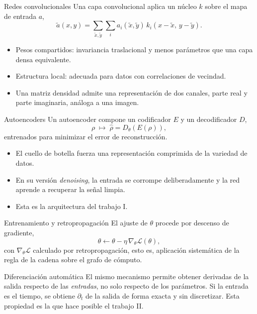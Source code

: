 \documentclass[10pt,aspectratio=169]{beamer}
\newcommand{\dens}{\rho}
\newcommand{\densh}{\hat{\rho}}
\begin{document}
\begin{frame}{Redes convolucionales}
  Una capa convolucional aplica un núcleo $k$ sobre el mapa de entrada $a$,
  \[
    \tilde{a}(x,y) = \sum_{\tilde{x},\tilde{y}} \sum_i a_i(\tilde{x},\tilde{y})\, k_i(x-\tilde{x},\, y-\tilde{y}).
  \]
  \pause
  \vfill
  \begin{itemize}
    \item Pesos compartidos: invariancia traslacional y menos parámetros que una capa densa equivalente.
    \item Estructura local: adecuada para datos con correlaciones de vecindad.
    \item Una matriz densidad admite una representación de dos canales, parte real y parte imaginaria, análoga a una imagen.
  \end{itemize}
\end{frame}

\begin{frame}{Autoencoders}
  Un autoencoder compone un codificador $E$ y un decodificador $D$,
  \[
    \dens \;\longmapsto\; \densh = D_\theta(E(\dens)),
  \]
  entrenados para minimizar el error de reconstrucción.
  \pause
  \vfill
  \begin{itemize}
    \item El cuello de botella fuerza una representación comprimida de la variedad de datos.
    \item En su versión \emph{denoising}, la entrada se corrompe deliberadamente y la red aprende a recuperar la señal limpia.
    \item Esta es la arquitectura del trabajo I.
  \end{itemize}
\end{frame}

\begin{frame}{Entrenamiento y retropropagación}
  El ajuste de $\theta$ procede por descenso de gradiente,
  \[
    \theta \leftarrow \theta - \eta\, \nabla_\theta \mathcal{L}(\theta),
  \]
  con $\nabla_\theta \mathcal{L}$ calculado por retropropagación, esto es, aplicación sistemática de la regla de la cadena sobre el grafo de cómputo.
  \pause
  \vfill
  \begin{block}{Diferenciación automática}
    El mismo mecanismo permite obtener derivadas de la salida respecto de las \emph{entradas}, no solo respecto de los parámetros. Si la entrada es el tiempo, se obtiene $\partial_t$ de la salida de forma exacta y sin discretizar. Esta propiedad es la que hace posible el trabajo II.
  \end{block}
\end{frame}
\end{document}
